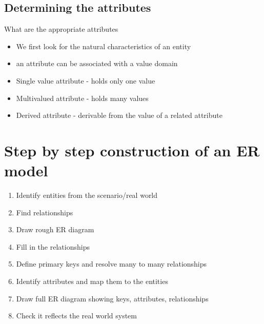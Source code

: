 \documentclass{article}[18pt]
\begin{document}
\subsection{Determining the attributes}
What are the appropriate attributes
\begin{itemize}
	\item We first look for the natural characteristics of an entity
	\item an attribute can be associated with a value domain
	\item Single value attribute - holds only one value
	\item Multivalued attribute - holds many values
	\item Derived attribute - derivable from the value of a related attribute
\end{itemize}
\section{Step by step construction of an ER model}
\begin{enumerate}
	\item Identify entities from the scenario/real world
	\item Find relationships
	\item Draw rough ER diagram
	\item Fill in the relationships
	\item Define primary keys and resolve many to many relationships
	\item Identify attributes and map them to the entities
	\item Draw full ER diagram showing keys, attributes, relationships
	\item Check it reflects the real world system
\end{enumerate}
\end{document}

